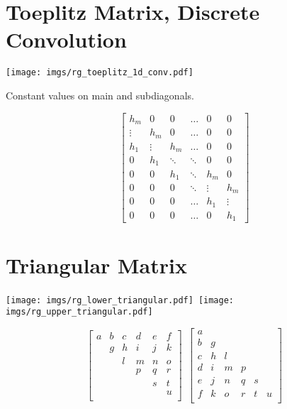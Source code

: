 \section{Toeplitz Matrix, Discrete Convolution}

\begin{center}
\texttt{[image: imgs/rg\_toeplitz\_1d\_conv.pdf]}
\end{center}

Constant values on main and subdiagonals.

\begin{equation}
\begin{bmatrix}
  h_m &   0 &   0 &      \hdots &   0 &   0 \\
  \vdots & h_m &   0 &   \hdots &   0 &   0 \\
  h_1 & \vdots & h_m &   \hdots &   0 &   0 \\
    0 & h_1 & \ddots & \ddots &   0 &   0 \\
    0 &   0 & h_1 &    \ddots & h_m &   0 \\
    0 &   0 &   0 &    \ddots & \vdots & h_m \\
    0 &   0 &   0 &      \hdots & h_1 & \vdots \\
    0 &   0 &   0 &      \hdots &   0 & h_1
\end{bmatrix}
\end{equation}


\section{Triangular Matrix}

\begin{center}
\texttt{[image: imgs/rg\_lower\_triangular.pdf]}~\texttt{[image: imgs/rg\_upper\_triangular.pdf]}
\end{center}

\begin{equation}
\begin{bmatrix}
a & b & c & d & e & f \\
  & g & h & i & j & k \\
  &   & l & m & n & o \\
  &   &   & p & q & r \\
  &   &   &   & s & t \\
  &   &   &   &   & u \\
\end{bmatrix}
~
~
\begin{bmatrix}
a &   &   &   &   &   \\
b & g &   &   &   &   \\
c & h & l &   &   &   \\
d & i & m & p &   &   \\
e & j & n & q & s &   \\
f & k & o & r & t & u \\
\end{bmatrix}
\end{equation}

